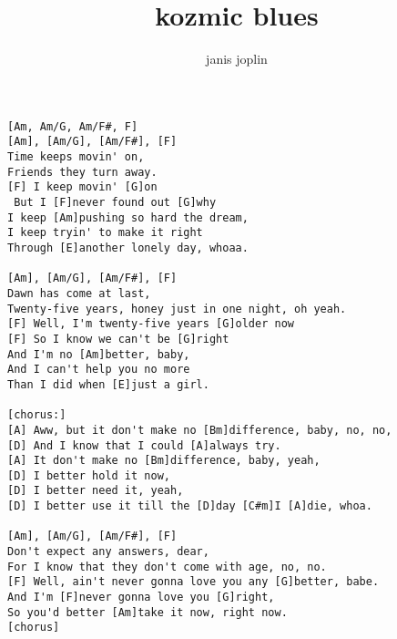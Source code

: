\author{janis joplin}
\title{kozmic blues}
\maketitle
\begin{verbatim}
[Am, Am/G, Am/F#, F]
[Am], [Am/G], [Am/F#], [F]
Time keeps movin' on,
Friends they turn away.
[F] I keep movin' [G]on
 But I [F]never found out [G]why
I keep [Am]pushing so hard the dream,
I keep tryin' to make it right
Through [E]another lonely day, whoaa. 
 
[Am], [Am/G], [Am/F#], [F]
Dawn has come at last,
Twenty-five years, honey just in one night, oh yeah.
[F] Well, I'm twenty-five years [G]older now
[F] So I know we can't be [G]right
And I'm no [Am]better, baby,
And I can't help you no more
Than I did when [E]just a girl.

[chorus:]
[A] Aww, but it don't make no [Bm]difference, baby, no, no, 
[D] And I know that I could [A]always try. 
[A] It don't make no [Bm]difference, baby, yeah,
[D] I better hold it now,
[D] I better need it, yeah,
[D] I better use it till the [D]day [C#m]I [A]die, whoa.

[Am], [Am/G], [Am/F#], [F]
Don't expect any answers, dear,
For I know that they don't come with age, no, no.
[F] Well, ain't never gonna love you any [G]better, babe.
And I'm [F]never gonna love you [G]right,
So you'd better [Am]take it now, right now.
[chorus]
\end{verbatim}